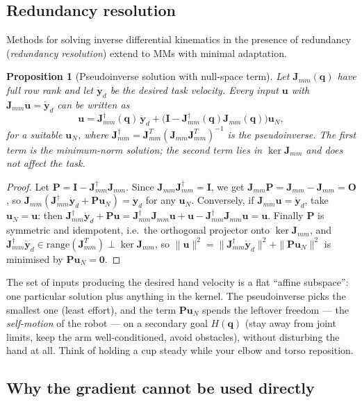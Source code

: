 \documentclass[11pt,a4paper]{article}
\newcommand{\Jmm}{\bm{J}_{mm}}
\theoremstyle{plain}
\newtheorem{proposition}[theorem]{Proposition}
\theoremstyle{definition}
\theoremstyle{remark}
\begin{document}
\subsection{Redundancy resolution}

Methods for solving inverse differential kinematics in the presence of redundancy (\emph{redundancy resolution}) extend to MMs with minimal adaptation.

\begin{proposition}[Pseudoinverse solution with null-space term]\label{prop:ik}
Let $\Jmm(\bm q)$ have full row rank and let $\dot{\bm y}_d$ be the desired task velocity. Every input $\bm u$ with $\Jmm\bm u=\dot{\bm y}_d$ can be written as
\[
\bm u=\Jmm^\dagger(\bm q)\,\dot{\bm y}_d+\bigl(\bm I-\Jmm^\dagger(\bm q)\Jmm(\bm q)\bigr)\bm u_N ,
\]
for a suitable $\bm u_N$, where $\Jmm^\dagger=\Jmm^T(\Jmm\Jmm^T)^{-1}$ is the pseudoinverse. The first term is the minimum-norm solution; the second term lies in $\ker\Jmm$ and does not affect the task.
\end{proposition}

\begin{proof}
Let $\bm P=\bm I-\Jmm^\dagger\Jmm$. Since $\Jmm\Jmm^\dagger=\bm I$, we get $\Jmm\bm P=\Jmm-\Jmm=\bm O$, so $\Jmm(\Jmm^\dagger\dot{\bm y}_d+\bm P\bm u_N)=\dot{\bm y}_d$ for any $\bm u_N$. Conversely, if $\Jmm\bm u=\dot{\bm y}_d$, take $\bm u_N=\bm u$: then $\Jmm^\dagger\dot{\bm y}_d+\bm P\bm u=\Jmm^\dagger\Jmm\bm u+\bm u-\Jmm^\dagger\Jmm\bm u=\bm u$. Finally $\bm P$ is symmetric and idempotent, i.e.\ the orthogonal projector onto $\ker\Jmm$, and $\Jmm^\dagger\dot{\bm y}_d\in\mathrm{range}(\Jmm^T)\perp\ker\Jmm$, so $\|\bm u\|^2=\|\Jmm^\dagger\dot{\bm y}_d\|^2+\|\bm P\bm u_N\|^2$ is minimised by $\bm P\bm u_N=\bm 0$.
\end{proof}

\begin{intuition}
The set of inputs producing the desired hand velocity is a flat ``affine subspace'': one particular solution plus anything in the kernel. The pseudoinverse picks the smallest one (least effort), and the term $\bm P\bm u_N$ spends the leftover freedom --- the \emph{self-motion} of the robot --- on a secondary goal $H(\bm q)$ (stay away from joint limits, keep the arm well-conditioned, avoid obstacles), without disturbing the hand at all. Think of holding a cup steady while your elbow and torso reposition.
\end{intuition}

\subsection{Why the gradient cannot be used directly}
\end{document}
